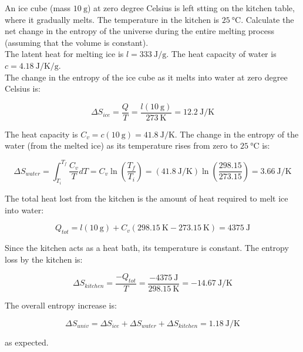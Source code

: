 \begin{texample}
	An ice cube (mass $\SI{10}{\gram}$) at zero degree Celsius is left stting on the kitchen table, where it gradually melts. The temperature in the kitchen is $\SI{25}{\celsius}$. Calculate the net change in the entropy of the universe during the entire melting process (assuming that the volume is constant). \\
	
	The latent heat for melting ice is $l=\SI{333}{\joule\per\gram}$. The heat capacity of water is $c=\SI{4.18}{\joule\per\kelvin\per\gram}$. \\
	
	The change in the entropy of the ice cube as it melts into water at zero degree Celsius is:
	
	\[\Delta S_{ice}=\frac{Q}{T}=\frac{l (\SI{10}{\gram})}{\SI{273}{\kelvin}}=\SI{12.2}{\joule\per\kelvin}\]
	
	The heat capacity is $C_v=c (\SI{10}{\gram})=\SI{41.8}{\joule\per\kelvin}$. The change in the entropy of the water (from the melted ice) as its temperature rises from zero to $\SI{25}{\celsius}$ is:
	
	\[\Delta S_{water}=\int_{T_i}^{T_f} \frac{C_v}{T}dT=C_v \ln\left(\frac{T_f}{T_i}\right)=(\SI{41.8}{\joule\per\kelvin}) \ln\left( \frac{298.15}{273.15} \right)=\SI{3.66}{\joule\per\kelvin}\]
	
	The total heat lost from the kitchen is the amount of heat required to melt ice into water:
	
	\[Q_{tot}=l (\SI{10}{\gram})+C_v (\SI{298.15}{\kelvin}-\SI{273.15}{\kelvin})=\SI{4375}{\joule}\]
	
	Since the kitchen acts as a heat bath, its temperature is constant. The entropy loss by the kitchen is:
	
	\[\Delta S_{kitchen}=\frac{-Q_{tot}}{T}=\frac{-\SI{4375}{\joule}}{\SI{298.15}{\kelvin}}=-\SI{14.67}{\joule\per\kelvin}\]
	
	The overall entropy increase is:
	
	\[\Delta S_{univ}=\Delta S_{ice}+\Delta S_{water}+\Delta S_{kitchen}=\SI{1.18}{\joule\per\kelvin}\]
	
	as expected.
\end{texample}

